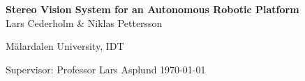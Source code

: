 \begin{titlepage}
\begin{center}
{\huge \bfseries Stereo Vision System for an Autonomous Robotic Platform}
\\[0.5cm]
{ \large Lars Cederholm \& Niklas Pettersson}

{ \large Mälardalen University, IDT}

{\large Supervisor:  Professor Lars Asplund}
\vfill
\today
\end{center}
\end{titlepage}
